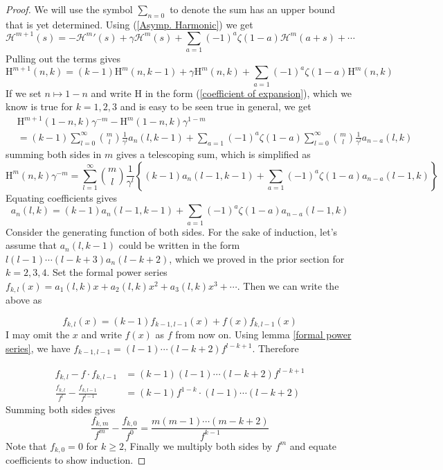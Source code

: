 \documentclass{article}
\begin{document}
\begin{proof}
    We will use the symbol $\sum_{n=0}$ to denote the sum has an upper bound that is yet determined. Using (\ref{Asymp. Harmonic}) we get\begin{equation}\label{relating m+1 to m}
        \mathcal{H}^{m+1}(s)=-{\mathcal{H}^m}'(s)+\gamma \mathcal{H}^m (s)+\sum_{a=1}(-1)^a \zeta(1-a)\mathcal{H}^m(a+s)+\cdots
    \end{equation} Pulling out the terms gives
    \[\mathrm{H}^{m+1}(n,k)=(k-1)\mathrm{H}^m(n,k-1)+\gamma\mathrm{H}^m(n,k)+\sum_{a=1}(-1)^a \zeta(1-a)\mathrm{H}^m(n,k)\]
If we set $n\mapsto 1-n$ and write H in the form (\ref{coefficient of expansion}), which we know is true for $k=1,2,3$ and is easy to be seen true in general, we get
\[\begin{split}
   & \mathrm{H}^{m+1}(1-n,k)\gamma^{-m}- \mathrm{H}^m(1-n,k)\gamma^{1-m} \\ & =(k-1)\sum_{l=0}^{\infty}\binom{m}{l}\frac{1}{\gamma^l}a_n(l,k-1) +\sum_{a=1} (-1)^a\zeta(1-a)\sum_{l=0}^{\infty}\binom{m}{l}\frac{1}{\gamma^l}a_{n-a}(l,k)
\end{split}\]
summing both sides in $m$ gives a telescoping sum, which is simplified as
\[\mathrm{H}^m(n,k)\gamma^{-m}=\sum_{l=1}^{\infty}\binom{m}{l}\frac{1}{\gamma^{l}}\left\{(k-1)a_n(l-1,k-1)+\sum_{a=1}(-1)^a \zeta(1-a)a_{n-a}(l-1,k)\right\}\]
Equating coefficients gives
\[a_n(l,k)=(k-1)a_n(l-1,k-1)+\sum_{a=1}(-1)^a \zeta(1-a)a_{n-a}(l-1,k)\]
Consider the generating function of both sides. For the sake of induction, let's assume that $a_n(l,k-1)$ could be written in the form $l(l-1)\cdots(l-k+3)a_n(l-k+2)$, which we proved in the prior section for $k=2,3,4$. Set the formal power series $f_{k,l}(x)=a_1(l,k)x +a_2(l,k)x^2+a_3(l,k)x^3+\cdots$. Then we can write the above as 

$$f_{k,l}(x)=(k-1)f_{k-1,l-1}(x)+f(x)f_{k,l-1}(x)$$
I may omit the $x$ and write $f(x)$ as $f$ from now on. Using lemma \ref{formal power series}, we have $f_{k-1,l-1}=(l-1)\cdots(l-k+2)f^{l-k+1}$. Therefore

\[\begin{split}
    f_{k,l}-f\cdot f_{k,l-1}&=(k-1)(l-1)\cdots(l-k+2)f^{l-k+1}\\ 
\frac{f_{k,l}}{f^l}-\frac{f_{k,l-1}}{f^{l-1}}& =(k-1)f^{1-k}\cdot (l-1)\cdots (l-k+2)
\end{split}\]
Summing both sides gives
\[\frac{f_{k,m}}{f^m}-\frac{f_{k,0}}{f^0}=\frac{m(m-1)\cdots(m-k+2)}{f^{k-1}}\]
Note that $f_{k,0}=0$ for $k\geq 2$, Finally we multiply both sides by $f^m$ and equate coefficients to show induction.\end{proof}
\end{document}
